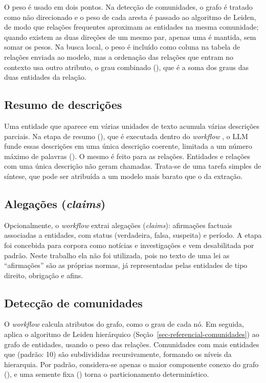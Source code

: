 O peso é usado em dois pontos. Na detecção de comunidades, o grafo é tratado como não direcionado e o peso de cada aresta é passado ao algoritmo de Leiden, de modo que relações frequentes aproximam as entidades na mesma comunidade; quando existem as duas direções de um mesmo par, apenas uma é mantida, sem somar os pesos. Na busca local, o peso é incluído como coluna na tabela de relações enviada ao modelo, mas a ordenação das relações que entram no contexto usa outro atributo, o grau combinado (), que é a soma dos graus das duas entidades da relação.

\subsection{Resumo de descrições}
\label{sec-graphrag-indexacao-resumo}

Uma entidade que aparece em várias unidades de texto acumula várias descrições parciais. Na etapa de resumo (), que é executada dentro do \textit{workflow} , o LLM funde essas descrições em uma única descrição coerente, limitada a um número máximo de palavras (). O mesmo é feito para as relações. Entidades e relações com uma única descrição não geram chamadas. Trata-se de uma tarefa simples de síntese, que pode ser atribuída a um modelo mais barato que o da extração.

\subsection{Alegações (\textit{claims})}
\label{sec-graphrag-indexacao-claims}

Opcionalmente, o \textit{workflow}  extrai alegações (\textit{claims}): afirmações factuais associadas a entidades, com status (verdadeira, falsa, suspeita) e período. A etapa foi concebida para corpora como notícias e investigações e vem desabilitada por padrão. Neste trabalho ela não foi utilizada, pois no texto de uma lei as ``afirmações'' são as próprias normas, já representadas pelas entidades de tipo direito, obrigação e afins.

\subsection{Detecção de comunidades}
\label{sec-graphrag-indexacao-comunidades}

O \textit{workflow}  calcula atributos do grafo, como o grau de cada nó. Em seguida,  aplica o algoritmo de Leiden hierárquico (Seção~\ref{sec-referencial-comunidades}) ao grafo de entidades, usando o peso das relações. Comunidades com mais entidades que  (padrão: 10) são subdivididas recursivamente, formando os níveis da hierarquia. Por padrão, considera-se apenas o maior componente conexo do grafo (), e uma semente fixa () torna o particionamento determinístico.

